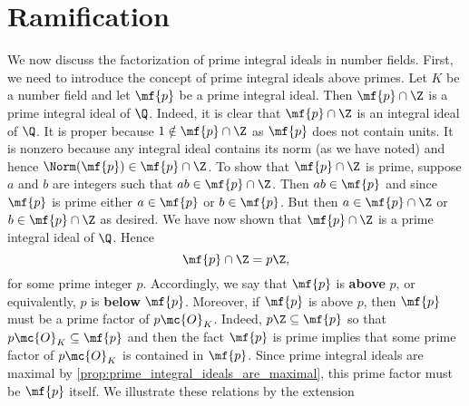   \section{Ramification}
    We now discuss the factorization of prime integral ideals in number fields. First, we need to introduce the concept of prime integral ideals above primes. Let $K$ be a number field and let $\mf{p}$ be a prime integral ideal. Then $\mf{p} \cap \Z$ is a prime integral ideal of $\Q$. Indeed, it is clear that $\mf{p} \cap \Z$ is an integral ideal of $\Q$. It is proper because $1 \notin \mf{p} \cap \Z$ as $\mf{p}$ does not contain units. It is nonzero because any integral ideal contains its norm (as we have noted) and hence $\Norm(\mf{p}) \in \mf{p} \cap \Z$. To show that $\mf{p} \cap \Z$ is prime, suppose $a$ and $b$ are integers such that $ab \in \mf{p} \cap \Z$. Then $ab \in \mf{p}$ and since $\mf{p}$ is prime either $a \in \mf{p}$ or $b \in \mf{p}$. But then $a \in \mf{p} \cap \Z$ or $b \in \mf{p} \cap \Z$ as desired. We have now shown that $\mf{p} \cap \Z$ is a prime integral ideal of $\Q$. Hence
    \[
      \mf{p} \cap \Z = p\Z,
    \]
    for some prime integer $p$. Accordingly, we say that $\mf{p}$ is \textbf{above} $p$, or equivalently, $p$ is \textbf{below} $\mf{p}$. Moreover, if $\mf{p}$ is above $p$, then $\mf{p}$ must be a prime factor of $p\mc{O}_{K}$. Indeed, $p\Z \subseteq \mf{p}$ so that $p\mc{O}_{K} \subseteq \mf{p}$ and then the fact $\mf{p}$ is prime implies that some prime factor of $p\mc{O}_{K}$ is contained in $\mf{p}$. Since prime integral ideals are maximal by \cref{prop:prime_integral_ideals_are_maximal}, this prime factor must be $\mf{p}$ itself. We illustrate these relations by the extension

    \begin{center}
    \end{center}

